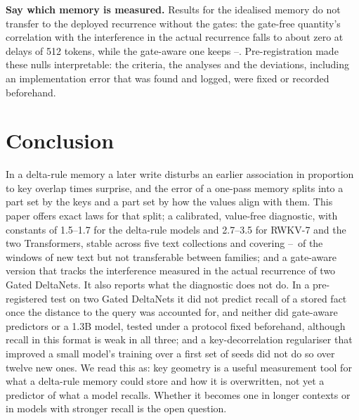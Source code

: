 \documentclass{article}
\begin{document}
\textbf{Say which memory is measured.} Results for the idealised memory do not transfer to the deployed recurrence without the gates: the gate-free quantity's correlation with the interference in the actual recurrence falls to about zero at delays of 512 tokens, while the gate-aware one keeps \gatePartLo--\gatePartHi. Pre-registration made these nulls interpretable: the criteria, the analyses and the deviations, including an implementation error that was found and logged, were fixed or recorded beforehand.

\section{Conclusion}\label{sec:concl}
In a delta-rule memory a later write disturbs an earlier association in proportion to key overlap times surprise, and the error of a one-pass memory splits into a part set by the keys and a part set by how the values align with them. This paper offers exact laws for that split; a calibrated, value-free diagnostic, with constants of 1.5--1.7 for the delta-rule models and 2.7--3.5 for RWKV-7 and the two Transformers, stable across five text collections and covering \heldCovLo--\heldCovHi\ of the windows of new text but not transferable between families; and a gate-aware version that tracks the interference measured in the actual recurrence of two Gated DeltaNets. It also reports what the diagnostic does not do. In a pre-registered test on two Gated DeltaNets it did not predict recall of a stored fact once the distance to the query was accounted for, and neither did gate-aware predictors or a 1.3B model, tested under a protocol fixed beforehand, although recall in this format is weak in all three; and a key-decorrelation regulariser that improved a small model's training over a first set of seeds did not do so over twelve new ones. We read this as: key geometry is a useful measurement tool for what a delta-rule memory could store and how it is overwritten, not yet a predictor of what a model recalls. Whether it becomes one in longer contexts or in models with stronger recall is the open question.
\end{document}
